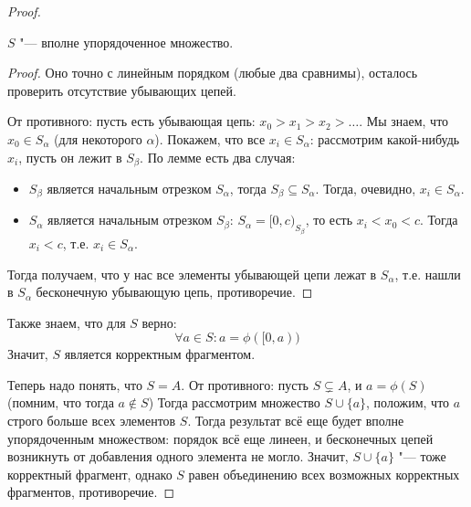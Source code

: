\begin{proof}
	\begin{assertion}
		$S$ "--- вполне упорядоченное множество.
	\end{assertion}
	\begin{proof}
		Оно точно с линейным порядком (любые два сравнимы), осталось проверить отсутствие убывающих цепей.

		От противного: пусть есть убывающая цепь: $x_0 > x_1 > x_2 > \dots$.
		Мы знаем, что $x_0 \in S_\alpha$ (для некоторого $\alpha$).
		Покажем, что все $x_i \in S_\alpha$:
		рассмотрим какой-нибудь $x_i$, пусть он лежит в $S_\beta$.
		По лемме есть два случая:
		\begin{itemize}
			\item
				$S_\beta$ является начальным отрезком $S_\alpha$, тогда $S_\beta \subseteq S_\alpha$.
				Тогда, очевидно, $x_i \in S_\alpha$.
			\item
				$S_\alpha$ является начальным отрезком $S_\beta$: $S_\alpha = [0, c)_{S_\beta}$,
				то есть $x_i < x_0 < c$.
				Тогда $x_i < c$, т.е. $x_i \in S_\alpha$.
		\end{itemize}
		Тогда получаем, что у нас все элементы убывающей цепи лежат в $S_\alpha$,
		т.е. нашли в $S_\alpha$ бесконечную убывающую цепь, противоречие.
	\end{proof}
	Также знаем, что для $S$ верно:
	\[ \forall a \in S \colon a = \phi([0, a)) \]
	Значит, $S$ является корректным фрагментом.

	Теперь надо понять, что $S = A$.
	От противного: пусть $S \subsetneq A$, и $a = \phi(S)$ (помним, что тогда $a \notin S$)
	Тогда рассмотрим множество $S \cup \{a\}$, положим, что $a$ строго больше всех элементов $S$.
	Тогда результат всё еще будет вполне упорядоченным множеством: порядок всё еще линеен,
	и бесконечных цепей возникнуть от добавления одного элемента не могло.
	Значит, $S \cup \{a \}$ "--- тоже корректный фрагмент, однако $S$ равен объединению всех
	возможных корректных фрагментов, противоречие.
\end{proof}

